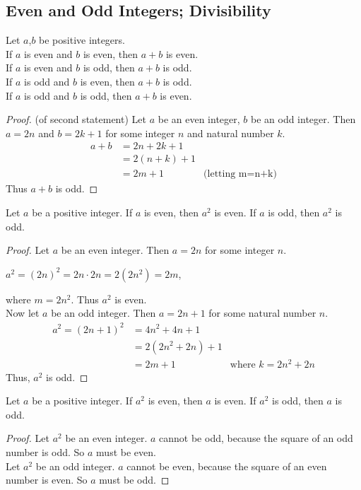 \documentclass[12pt]{article}
\begin{document}
\subsection{Even and Odd Integers; Divisibility}
\begin{theorem}
Let $a$,$b$ be positive integers.\\
If $a$ is even and $b$ is even, then $a+b$ is even. \\
If $a$ is even and $b$ is odd, then $a+b$ is odd. \\
If $a$ is odd and $b$ is even, then $a+b$ is odd. \\
If $a$ is odd and $b$ is odd, then $a+b$ is even.
\end{theorem}
\begin{proof}
(of second statement) Let $a$ be an even integer, $b$ be an odd integer. Then $a=2n$ and $b=2k+1$ for some integer $n$ and natural number $k$.
\begin{align*}
a+b&=2n+2k+1 \\
&=2(n+k)+1 \\
&=2m+1 &\text {(letting m=n+k)}
\end{align*}
Thus $a+b$ is odd.
\end{proof}
\begin{theorem}
Let $a$ be a positive integer. If $a$ is even, then $a^2$ is even. If $a$ is odd, then $a^2$ is odd.
\end{theorem}
\begin{proof}
Let $a$ be an even integer. Then $a=2n$ for some integer $n$.
\begin{center}
$a^2=(2n)^2=2n\cdot2n=2(2n^2)=2m$,
\end{center}
where $m=2n^2$. Thus $a^2$ is even. \\
Now let $a$ be an odd integer. Then $a=2n+1$ for some natural number $n$.
\begin{align*}
a^2=(2n+1)^2&=4n^2+4n+1 \\
&=2(2n^2+2n)+1 \\
&=2m+1 &\text{where $k=2n^2+2n$}
\end{align*}
Thus, $a^2$ is odd.
\end{proof}
\begin{corollary}
Let $a$ be a positive integer. If $a^2$ is even, then $a$ is even. If $a^2$ is odd, then $a$ is odd.
\end{corollary}
\begin{proof}
Let $a^2$ be an even integer. $a$ cannot be odd, because the square of an odd number is odd. So $a$ must be even. \\
Let $a^2$ be an odd integer. $a$ cannot be even, because the square of an even number is even. So $a$ must be odd.
\end{proof}
\end{document}
